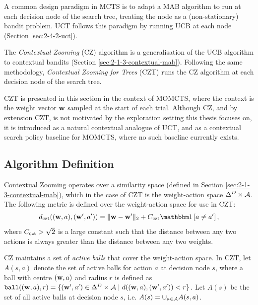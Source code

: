     A common design paradigm in MCTS is to adapt a MAB algorithm to run at each decision node of the search tree, treating the node as a (non-stationary) bandit problem. UCT follows this paradigm by running UCB at each node (Section \ref{sec:2-4-2-uct}). 
    
    The \textit{Contextual Zooming} (CZ) algorithm \cite{cz,cz_long} is a generalisation of the UCB algorithm to contextual bandits (Section \ref{sec:2-1-3-contextual-mab}). Following the same methodology, \textit{Contextual Zooming for Trees} (CZT) runs the CZ algorithm at each decision node of the search tree. 
    
    CZT is presented in this section in the context of MOMCTS, where the context is the weight vector $\mathbf{w}$ sampled at the start of each trial. Although CZ, and by extension CZT, is not motivated by the exploration setting this thesis focuses on, it is introduced as a natural contextual analogue of UCT, and as a contextual search policy baseline for MOMCTS, where no such baseline currently exists.

\subsection{Algorithm Definition}
\label{sec:5-2-1-czt}

    Contextual Zooming operates over a similarity space (defined in Section \ref{sec:2-1-3-contextual-mab}), which in the case of CZT is the weight-action space $\Delta^D\times\mathcal{A}$. The following metric is defined over the weight-action space for use in CZT:
    \begin{align}
        \dczt((\bff{w},a),(\bff{w}',a')) = \| \bff{w} - \bff{w}' \|_2 + C_{\textnormal{czt}}\one\left[a\neq a'\right], \label{eq:5:czt_metric}
    \end{align}
    where $C_{\textnormal{czt}}>\sqrt{2}$ is a large constant such that the distance between any two actions is always greater than the distance between any two weights.

    CZ maintains a set of \textit{active balls} that cover the weight-action space. 
    In CZT, let $A(s,a)$ denote the set of active balls for action $a$ at decision node $s$, where a ball with centre $(\mathbf{w},a)$ and radius $r$ is defined as $\textnormal{\texttt{ball}}((\mathbf{w},a),r) = \{(\mathbf{w}',a')\in\Delta^D\times\mathcal{A} \mid d((\mathbf{w},a),(\mathbf{w}',a')) < r\}$. Let $A(s)$ be the set of all active balls at decision node $s$, i.e. $A(s) = \cup_{a\in\mathcal{A}} A(s,a)$.

